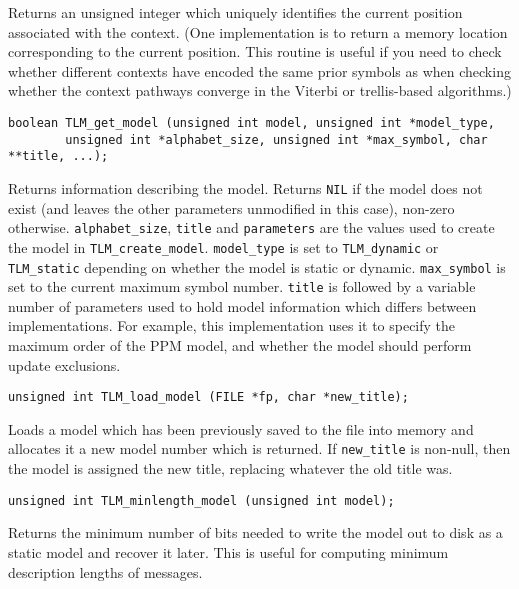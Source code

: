 \documentclass[11pt]{article}
\begin{document}
{\vspace{-0.2cm}
Returns an unsigned integer which uniquely identifies the current position
associated with the context. (One implementation is to return a memory
location corresponding to the current position. This routine is useful if
you need to check whether different contexts have encoded the same prior
symbols as when checking whether the context pathways converge in the
Viterbi or trellis-based algorithms.)

\begin{verbatim}
boolean TLM_get_model (unsigned int model, unsigned int *model_type,
        unsigned int *alphabet_size, unsigned int *max_symbol, char **title, ...);
\end{verbatim}

\vspace{-0.2cm}
Returns information describing the model. Returns \verb|NIL| if the model
does not exist (and leaves the other parameters unmodified in this case),
non-zero otherwise.  \verb|alphabet_size|, \verb|title| and
\verb|parameters| are the values used to create the model in
\verb|TLM_create_model|. \verb|model_type| is set to \verb|TLM_dynamic|
or \verb|TLM_static| depending on whether the model is static or dynamic.
\verb|max_symbol| is set to the current maximum symbol number. \verb|title|
is followed by a variable number of parameters used to hold model information which differs
between implementations. For example, this implementation uses it to specify
the maximum order of the PPM model, and whether the model should perform
update exclusions. 

\begin{verbatim}
unsigned int TLM_load_model (FILE *fp, char *new_title);
\end{verbatim}

\vspace{-0.2cm}
Loads a model which has been previously saved to the file into memory and
allocates it a new model number which is returned. If \verb|new_title|
is non-null, then the model is assigned the new title, replacing whatever
the old title was. 

\begin{verbatim}
unsigned int TLM_minlength_model (unsigned int model);
\end{verbatim}

\vspace{-0.2cm}
Returns the minimum number of bits needed to write the model
out to disk as a static model and recover it later. This is
useful for computing minimum description lengths of messages.

}
\end{document}
